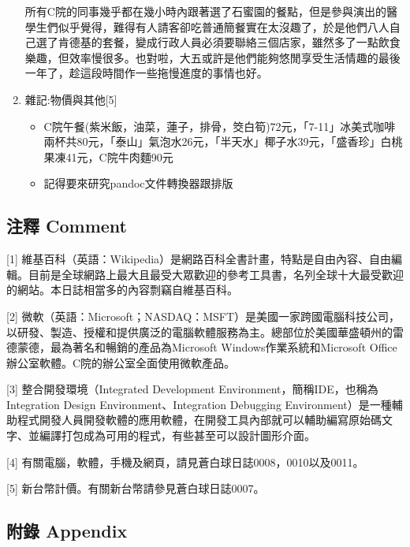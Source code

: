 \documentclass[
]{article}
\providecommand{\tightlist}{%
  \setlength{\itemsep}{0pt}\setlength{\parskip}{0pt}}
\begin{document}
\begin{enumerate}
  所有C院的同事幾乎都在幾小時內跟著選了石蜜園的餐點，但是參與演出的醫學生們似乎覺得，難得有人請客卻吃普通簡餐實在太沒趣了，於是他們八人自己選了肯德基的套餐，變成行政人員必須要聯絡三個店家，雖然多了一點飲食樂趣，但效率慢很多。也對啦，大五或許是他們能夠悠閒享受生活情趣的最後一年了，趁這段時間作一些拖慢進度的事情也好。
\item
  雜記:物價與其他{[}5{]}

  \begin{itemize}
  \tightlist
  \item
    C院午餐(紫米飯，油菜，蓮子，排骨，筊白筍)72元，「7-11」冰美式咖啡兩杯共80元，「泰山」氣泡水26元，「半天水」椰子水39元，「盛香珍」白桃果凍41元，C院牛肉麵90元
  \item
    記得要來研究pandoc文件轉換器跟排版
  \end{itemize}
\end{enumerate}

\hypertarget{ux6ce8ux91cb-comment-19}{%
\subsection{注釋 Comment}\label{ux6ce8ux91cb-comment-19}}

{[}1{]}
維基百科（英語：Wikipedia）是網路百科全書計畫，特點是自由內容、自由編輯。目前是全球網路上最大且最受大眾歡迎的參考工具書，名列全球十大最受歡迎的網站。本日誌相當多的內容剽竊自維基百科。

{[}2{]}
微軟（英語：Microsoft；NASDAQ：MSFT）是美國一家跨國電腦科技公司，以研發、製造、授權和提供廣泛的電腦軟體服務為主。總部位於美國華盛頓州的雷德蒙德，最為著名和暢銷的產品為Microsoft
Windows作業系統和Microsoft
Office辦公室軟體。C院的辦公室全面使用微軟產品。

{[}3{]} 整合開發環境（Integrated Development
Environment，簡稱IDE，也稱為Integration Design Environment、Integration
Debugging
Environment）是一種輔助程式開發人員開發軟體的應用軟體，在開發工具內部就可以輔助編寫原始碼文字、並編譯打包成為可用的程式，有些甚至可以設計圖形介面。

{[}4{]} 有關電腦，軟體，手機及網頁，請見蒼白球日誌0008，0010以及0011。

{[}5{]} 新台幣計價。有關新台幣請參見蒼白球日誌0007。

\hypertarget{ux9644ux9304-appendix-18}{%
\subsection{附錄 Appendix}\label{ux9644ux9304-appendix-18}}
\end{document}
